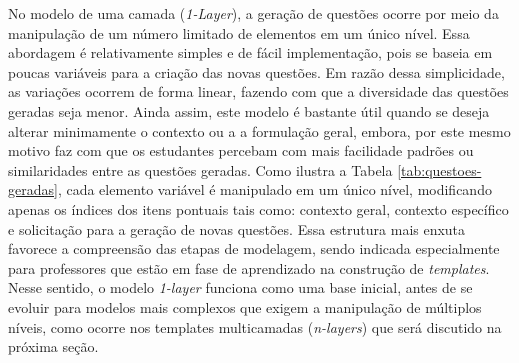No modelo de uma camada (\textit{1-Layer}), a geração de questões ocorre por meio da manipulação de um número limitado de elementos em um único nível. Essa abordagem é relativamente simples e de fácil implementação, pois se baseia em poucas variáveis para a criação das novas questões. Em razão dessa simplicidade, as variações ocorrem de forma linear, fazendo com que a diversidade das questões geradas seja menor. Ainda assim, este modelo é bastante útil quando se deseja alterar minimamente o contexto ou a a formulação geral, embora, por este mesmo motivo faz com que os estudantes percebam com mais facilidade padrões ou similaridades entre as questões geradas. 
Como ilustra a Tabela \ref{tab:questoes-geradas}, cada elemento variável é manipulado em um único nível, modificando apenas os índices dos itens pontuais tais como: contexto geral, contexto específico e solicitação para a geração de novas questões. Essa estrutura mais enxuta favorece a compreensão das etapas de modelagem, sendo indicada especialmente para professores que estão em fase de aprendizado na construção de \textit{templates}. Nesse sentido, o modelo \textit{1-layer} funciona como uma base inicial, antes de se evoluir para modelos mais complexos que exigem a manipulação de múltiplos níveis, como ocorre nos templates multicamadas (\textit{n-layers}) que será discutido na próxima seção.



